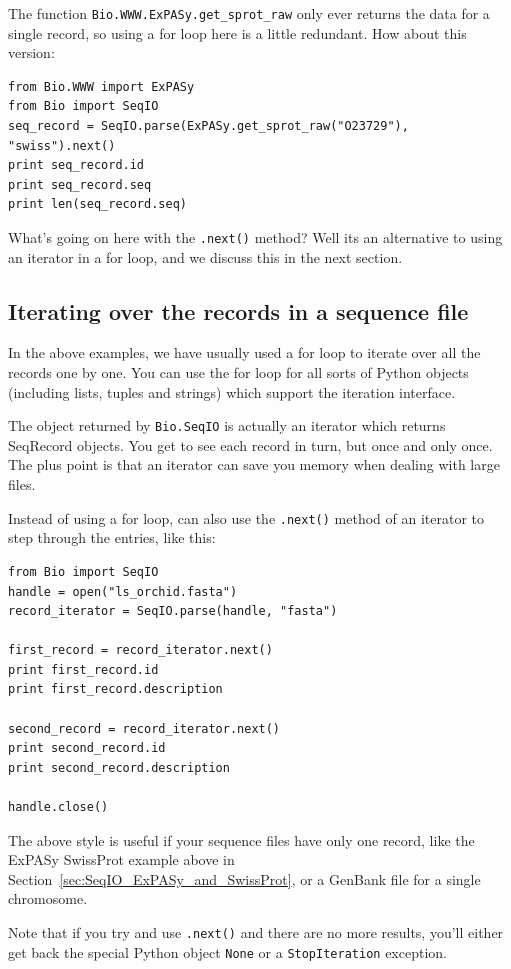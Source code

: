 \documentclass{report}
\begin{document}
The function \verb|Bio.WWW.ExPASy.get_sprot_raw| only ever returns the data for a single record, so using a for loop here is a little redundant. How about this version:

\begin{verbatim}
from Bio.WWW import ExPASy
from Bio import SeqIO
seq_record = SeqIO.parse(ExPASy.get_sprot_raw("O23729"), "swiss").next()
print seq_record.id
print seq_record.seq
print len(seq_record.seq)
\end{verbatim}

What's going on here with the \verb|.next()| method? Well its an alternative to using an iterator in a for loop, and we discuss this in the next section.

\subsection{Iterating over the records in a sequence file}

In the above examples, we have usually used a for loop to iterate over all the records one by one.  You can use the for loop for all sorts of Python objects (including lists, tuples and strings) which support the iteration interface.

The object returned by \verb|Bio.SeqIO| is actually an iterator which returns SeqRecord objects.  You get to see each record in turn, but once and only once.  The plus point is that an iterator can save you memory when dealing with large files.

Instead of using a for loop, can also use the \verb|.next()| method of an iterator to step through the entries, like this:

\begin{verbatim}
from Bio import SeqIO
handle = open("ls_orchid.fasta")
record_iterator = SeqIO.parse(handle, "fasta")

first_record = record_iterator.next()
print first_record.id
print first_record.description

second_record = record_iterator.next()
print second_record.id
print second_record.description

handle.close()
\end{verbatim}

\noindent The above style is useful if your sequence files have only one record, like the ExPASy SwissProt example above in Section~\ref{sec:SeqIO_ExPASy_and_SwissProt}, or a GenBank file for a single chromosome.

Note that if you try and use \verb|.next()| and there are no more results, you'll either get back the special Python object \verb|None| or a \verb|StopIteration| exception.
\end{document}
